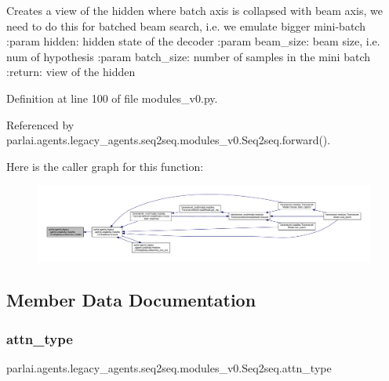 \begin{DoxyVerb}Creates a view of the hidden where batch axis is collapsed with beam axis,
we need to do this for batched beam search, i.e. we emulate bigger mini-batch
:param hidden: hidden state of the decoder
:param beam_size: beam size, i.e. num of hypothesis
:param batch_size: number of samples in the mini batch
:return: view of the hidden
\end{DoxyVerb}
 

Definition at line 100 of file modules\+\_\+v0.\+py.



Referenced by parlai.\+agents.\+legacy\+\_\+agents.\+seq2seq.\+modules\+\_\+v0.\+Seq2seq.\+forward().

Here is the caller graph for this function\+:
\nopagebreak
\begin{figure}[H]
\begin{center}
\leavevmode
\includegraphics[width=350pt]{classparlai_1_1agents_1_1legacy__agents_1_1seq2seq_1_1modules__v0_1_1Seq2seq_adab65a09af78ad2a9bcdca010f0d0fe6_icgraph}
\end{center}
\end{figure}


\subsection{Member Data Documentation}
\mbox{\label{classparlai_1_1agents_1_1legacy__agents_1_1seq2seq_1_1modules__v0_1_1Seq2seq_a005c8c9a0c2fc950aac6841b002284f9}} 
\subsubsection{\texorpdfstring{attn\+\_\+type}{attn\_type}}
{\footnotesize\ttfamily parlai.\+agents.\+legacy\+\_\+agents.\+seq2seq.\+modules\+\_\+v0.\+Seq2seq.\+attn\+\_\+type}



